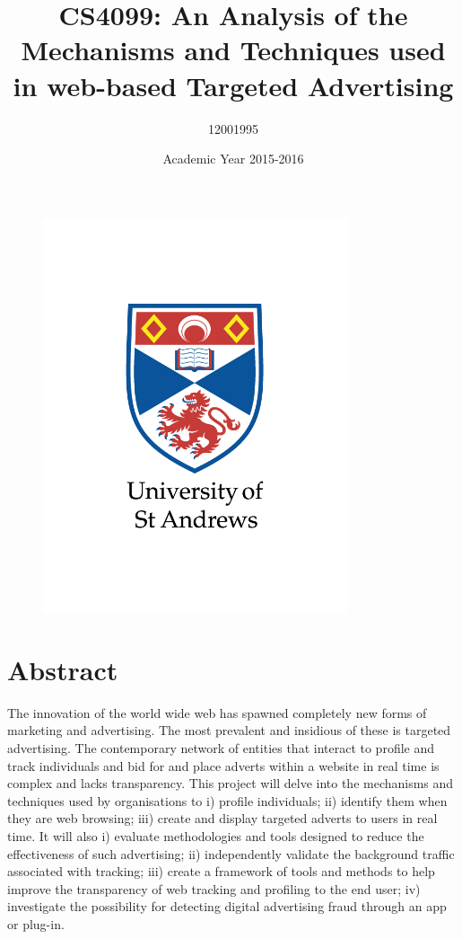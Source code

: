 \documentclass{article}
\title{CS4099: An Analysis of the Mechanisms and Techniques used in web-based Targeted Advertising}
\author{12001995}
\date{Academic Year 2015-2016}
\begin{document}
\maketitle

\begin{figure}[H]
  \centering
    \includegraphics[width=0.8\textwidth]{university_logo.png}
\end{figure}

\pagebreak

\tableofcontents

\pagebreak

\section{Abstract}
The innovation of the world wide web has spawned  completely new forms of marketing and advertising. The most prevalent and insidious of these  is targeted advertising. The contemporary network of entities that interact to profile and track individuals and  bid for and place adverts within a website in real time is complex and lacks transparency. This project will  delve into the mechanisms and techniques used by organisations to i) profile individuals; ii) identify them when they are web browsing; iii) create and display targeted adverts to users in real time. It will also i) evaluate methodologies and tools designed to reduce the effectiveness of such advertising; ii) independently validate the background traffic associated with tracking; iii) create a framework of tools and methods to help improve the transparency of web tracking and profiling to the end user; iv) investigate the possibility for detecting digital advertising fraud through an app or plug-in.  
\end{document}
